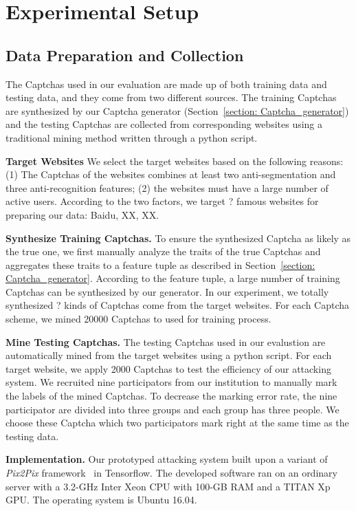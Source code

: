 \section{Experimental Setup}
\subsection{Data Preparation and Collection}
The Captchas used in our evaluation are made up of both training data and testing data, and they come from two different sources. The training Captchas are synthesized by our Captcha generator (Section~\ref{section: Captcha_generator}) and the testing Captchas are collected from corresponding websites using a traditional mining method written through a python script.

\noindent \textbf{Target Websites} We select the target websites based on the following reasons: (1) The Captchas of the websites combines at least two anti-segmentation and three anti-recognition features; (2) the websites must have a large number of active users. According to the two factors, we target ? famous websites for preparing our data: Baidu, XX, XX.

\noindent \textbf{Synthesize Training Captchas.} To ensure the synthesized Captcha as likely as the true one, we first manually analyze the traits of the true Captchas and aggregates these traits to a feature tuple as described in Section~\ref{section: Captcha_generator}. According to the feature tuple, a large number of training Captchas can be synthesized by our generator. In our experiment, we totally synthesized ? kinds of Captchas come from the target websites. For each Captcha scheme, we mined 20000 Captchas to used for training process.

\noindent \textbf{Mine Testing Captchas.} The testing Captchas used in our evalustion are automatically mined from the target websites using a python script. For each target website, we apply 2000 Captchas to test the efficiency of our attacking system.  We recruited nine participators from our institution to manually mark the labels of the mined Captchas. To decrease the marking error rate, the nine participator are divided into three groups and each group has three people. We choose these Captcha which two participators mark right at the same time as the testing data.

\noindent \textbf{Implementation.} Our prototyped attacking system built upon a variant of \emph{Pix2Pix} framework~\cite{Pix2PixCode} in Tensorflow. The developed software ran on an ordinary
server with a 3.2-GHz Inter Xeon CPU with 100-GB RAM and a TITAN Xp GPU. The operating system is Ubuntu 16.04.

